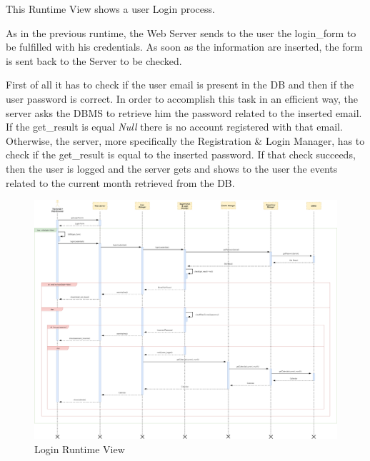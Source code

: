 This Runtime View shows a user Login process.\par
As in the previous runtime, the Web Server sends to the user the login\_form to be fulfilled with his credentials. As soon as the information are inserted, the form is sent back to the Server to be checked.\par
First of all it has to check if the user email is present in the DB and then if the user password is correct. In order to accomplish this task in an efficient way, the server asks the DBMS to retrieve him the password related to the inserted email. If the get\_result is equal \emph{Null} there is no account registered with that email. Otherwise, the server, more specifically the Registration \& Login Manager, has to check if the get\_result is equal to the inserted password.
If that check succeeds, then the user is logged and the server gets and shows to the user the events related to the current month retrieved from the DB.
\begin{figure}[H]
	\centering
	\includegraphics[scale=0.17]{Images/Runtime/Login}
	\caption{Login Runtime View}
\end{figure}

